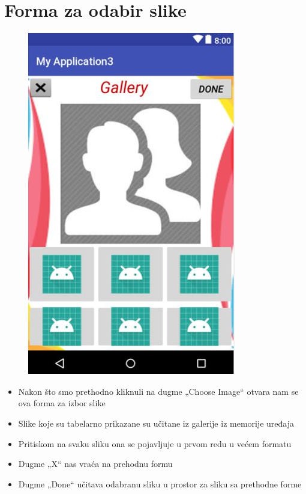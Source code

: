 \documentclass[12pt]{scrreprt}
\begin{document}
\section{Forma za odabir slike}

\begin{figure}[h]
	\begin{Center}
		\includegraphics{image4}
	\end{Center}
\end{figure}

\begin{itemize}
 \item	Nakon što smo prethodno kliknuli na dugme „Choose Image“ otvara nam se ova forma za izbor slike
\item	Slike koje su tabelarno prikazane su učitane iz galerije iz memorije uređaja
\item	Pritiskom na svaku sliku ona se pojavljuje u prvom redu u većem formatu
\item	Dugme „X“ nas vraća na prehodnu formu
\item	Dugme „Done“ učitava odabranu sliku u prostor za sliku sa prethodne forme
\end{itemize}
\end{document}
